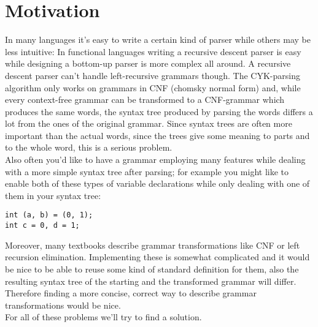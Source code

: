 \documentclass[a4paper]{article}
\begin{document}

\section*{Motivation}
In many languages it's easy to write a certain kind of parser while others may be less intuitive: In functional languages writing a recursive descent parser is easy while designing a bottom-up parser is more complex all around. A recursive descent parser can't handle left-recursive grammars though. The CYK-parsing algorithm only works on grammars in CNF (chomsky normal form) and, while every context-free grammar can be transformed to a CNF-grammar which produces the same words, the syntax tree produced by parsing the words differs a lot from the ones of the original grammar. Since syntax trees are often more important than the actual words, since the trees give some meaning to parts and to the whole word, this is a serious problem.\\
Also often you'd like to have a grammar employing many features while dealing with a more simple syntax tree after parsing; for example you might like to enable both of these types of variable declarations while only dealing with one of them in your syntax tree:
\begin{verbatim}
int (a, b) = (0, 1);
int c = 0, d = 1;
\end{verbatim}
Moreover, many textbooks describe grammar transformations like CNF or left recursion elimination. Implementing these is somewhat complicated and it would be nice to be able to reuse some kind of standard definition for them, also the resulting syntax tree of the starting and the transformed grammar will differ. Therefore finding a more concise, correct way to describe grammar transformations would be nice.\\
For all of these problems we'll try to find a solution.
\end{document}
